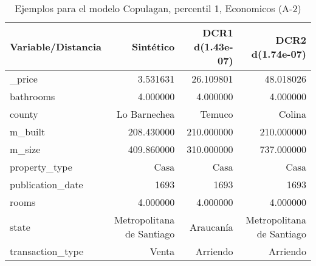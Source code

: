 \begin{table}[H]
\centering
\fontsize{10}{14}\selectfont
\caption{Ejemplos para el modelo Copulagan, percentil 1, Economicos (A-2)}
\label{table-example-economicos-a-2-copulagan-1p}
\begin{tabular}{|l|r|r|r|}
\hline
\rowcolor[gray]{0.8}
Variable/Distancia & Sintético & DCR1 d(1.43e-07) & DCR2 d(1.74e-07) \\
\hline \_price & \cellcolor[rgb]{0.9, 0.54, 0.52} 3.531631 & 26.109801 & 48.018026 \\
\hline bathrooms & \cellcolor[rgb]{0.9, 0.54, 0.52} 4.000000 & \cellcolor[rgb]{0.9, 0.54, 0.52} 4.000000 & \cellcolor[rgb]{0.9, 0.54, 0.52} 4.000000 \\
\hline county & \cellcolor[rgb]{0.9, 0.54, 0.52} Lo Barnechea & Temuco & Colina \\
\hline m\_built & \cellcolor[rgb]{0.9, 0.54, 0.52} 208.430000 & 210.000000 & 210.000000 \\
\hline m\_size & \cellcolor[rgb]{0.9, 0.54, 0.52} 409.860000 & 310.000000 & 737.000000 \\
\hline property\_type & \cellcolor[rgb]{0.9, 0.54, 0.52} Casa & \cellcolor[rgb]{0.9, 0.54, 0.52} Casa & \cellcolor[rgb]{0.9, 0.54, 0.52} Casa \\
\hline publication\_date & \cellcolor[rgb]{0.9, 0.54, 0.52} 1693 & \cellcolor[rgb]{0.9, 0.54, 0.52} 1693 & \cellcolor[rgb]{0.9, 0.54, 0.52} 1693 \\
\hline rooms & \cellcolor[rgb]{0.9, 0.54, 0.52} 4.000000 & \cellcolor[rgb]{0.9, 0.54, 0.52} 4.000000 & \cellcolor[rgb]{0.9, 0.54, 0.52} 4.000000 \\
\hline state & \cellcolor[rgb]{0.9, 0.54, 0.52} Metropolitana de Santiago & Araucanía & \cellcolor[rgb]{0.9, 0.54, 0.52} Metropolitana de Santiago \\
\hline transaction\_type & \cellcolor[rgb]{0.9, 0.54, 0.52} Venta & Arriendo & Arriendo \\
\hline
\end{tabular}
\end{table}
